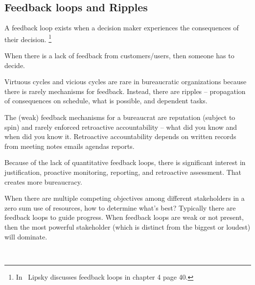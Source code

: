 \subsection*{Feedback loops and Ripples\label{sec:feedback-loop-and-ripples}}

A feedback loop exists when a decision maker experiences the consequences of their decision.
\footnote{In~\cite{1983_Lipsky} Lipsky discusses feedback loops in chapter 4 page 40.}

When there is a lack of feedback from customers/users, then someone has to decide.


Virtuous cycles and vicious cycles are rare in bureaucratic organizations because there is rarely mechanisms for feedback. Instead, there are ripples -- propagation of consequences on schedule, what is possible, and dependent tasks.


The (weak) feedback mechanisms for a bureaucrat are reputation (subject to spin) and rarely enforced retroactive accountability -- what did you know and when did you know it.
Retroactive accountability depends on written records from meeting notes emails agendas reports.


Because of the lack of quantitative feedback loops, there is significant interest in justification, proactive monitoring, reporting, and retroactive assessment. That creates more bureaucracy.




When there are multiple competing objectives among different stakeholders in a zero sum use of resources, how to determine what's best? Typically there are feedback loops to guide progress. When feedback loops are weak or not present, then the most powerful stakeholder (which is distinct from the biggest or loudest) will dominate. 


\ \\


